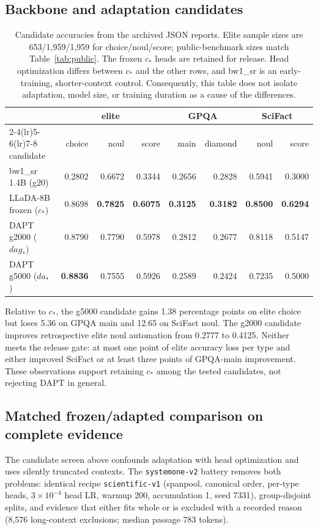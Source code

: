 \documentclass[11pt]{article}
\begin{document}
\subsection{Backbone and adaptation candidates}
\begin{table}[htbp]
\centering\small
\setlength{\tabcolsep}{3pt}
\begin{tabular}{lrrrrrrr}
\toprule
 & \multicolumn{3}{c}{elite} & \multicolumn{2}{c}{GPQA} &
   \multicolumn{2}{c}{SciFact} \\
\cmidrule(lr){2-4}\cmidrule(lr){5-6}\cmidrule(lr){7-8}
candidate & choice & noul & score & main & diamond & noul & score \\
\midrule
bw1\_sr 1.4B (g20) & 0.2802 & 0.6672 & 0.3344 & 0.2656 & 0.2828 & 0.5941 & 0.3000 \\
\midrule
LLaDA-8B frozen ($c_*$) & 0.8698 & \textbf{0.7825} & \textbf{0.6075} & \textbf{0.3125} & \textbf{0.3182} & \textbf{0.8500} & \textbf{0.6294} \\
DAPT g2000 ($dag_*$) & 0.8790 & 0.7790 & 0.5978 & 0.2812 & 0.2677 & 0.8118 & 0.5147 \\
DAPT g5000 ($da_*$) & \textbf{0.8836} & 0.7555 & 0.5926 & 0.2589 & 0.2424 & 0.7235 & 0.5000 \\
\bottomrule
\end{tabular}
\caption{Candidate accuracies from the archived JSON reports. Elite
sample sizes are 653/1{,}959/1{,}959 for choice/noul/score; public-benchmark
sizes match Table~\ref{tab:public}. The frozen $c_*$ heads are retained
for release. Head optimization differs between $c_*$ and the other rows,
and bw1\_sr is an early-training, shorter-context control. Consequently,
this table does not isolate adaptation, model size, or training duration
as a cause of the differences.}
\label{tab:candidates}
\end{table}

Relative to $c_*$, the g5000 candidate gains 1.38 percentage points on
elite choice but loses 5.36 on GPQA main and 12.65 on SciFact noul. The
g2000 candidate improves retrospective elite noul automation from
0.2777 to 0.4125. Neither meets the release gate: at most one point of
elite accuracy loss per type and either improved SciFact or at least
three points of GPQA-main improvement. These observations support
retaining $c_*$ among the tested candidates, not rejecting DAPT in general.

\subsection{Matched frozen/adapted comparison on complete evidence}
The candidate screen above confounds adaptation with head optimization
and uses silently truncated contexts. The \texttt{systemone-v2} battery
removes both problems: identical recipe \texttt{scientific-v1}
(spanpool, canonical order, per-type heads, $3\times10^{-4}$ head LR,
warmup 200, accumulation 1, seed 7331), group-disjoint splits, and
evidence that either fits whole or is excluded with a recorded reason
(8{,}576 long-context exclusions; median passage 783 tokens).
\end{document}
